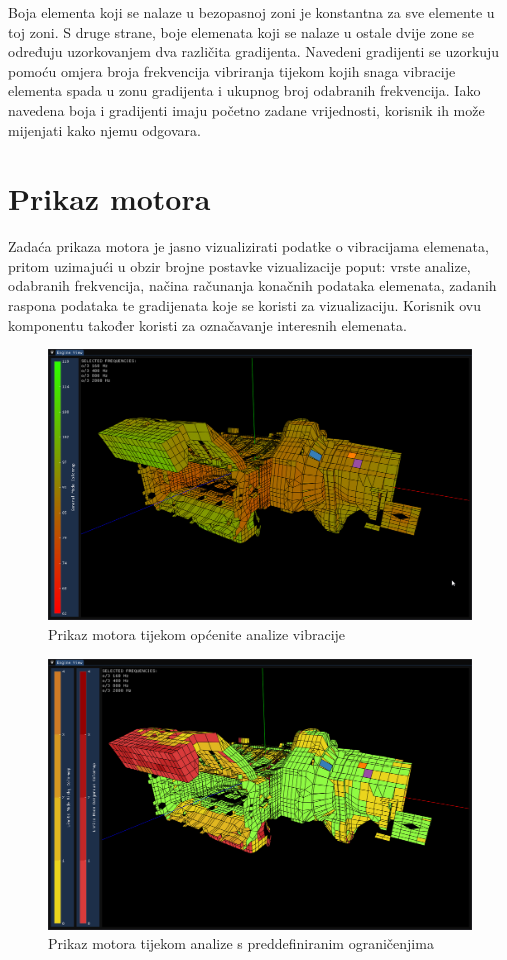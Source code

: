 \documentclass[times, utf8, diplomski]{fer}
\begin{document}
Boja elementa koji se nalaze u bezopasnoj zoni je konstantna za sve elemente u toj zoni. S druge strane, boje elemenata koji se nalaze u ostale dvije zone se određuju uzorkovanjem dva različita gradijenta. Navedeni gradijenti se uzorkuju pomoću omjera broja frekvencija vibriranja tijekom kojih snaga vibracije elementa spada u zonu gradijenta i ukupnog broj odabranih frekvencija. Iako navedena boja i gradijenti imaju početno zadane vrijednosti, korisnik ih može mijenjati kako njemu odgovara.\\


\section{Prikaz motora} \label{engine-view-section}
Zadaća prikaza motora je jasno vizualizirati podatke o vibracijama elemenata, pritom uzimajući u obzir brojne postavke vizualizacije poput: vrste analize, odabranih frekvencija, načina računanja konačnih podataka elemenata, zadanih raspona podataka te gradijenata koje se koristi za vizualizaciju. Korisnik ovu komponentu također koristi za označavanje interesnih elemenata.

\begin{figure}[H]
\centering
\includegraphics[width=0.85\linewidth]{engine_view_normal_mode.png}
\caption{Prikaz motora tijekom općenite analize vibracije}
\label{fig:normal-mode-engine-view}
\end{figure}
\begin{figure}[h]
\centering
\includegraphics[width=0.85\linewidth]{engine_view_limits.png}
\caption{Prikaz motora tijekom analize s preddefiniranim ograničenjima}
\label{fig:limits-mode-engine-view}
\end{figure}
\end{document}
